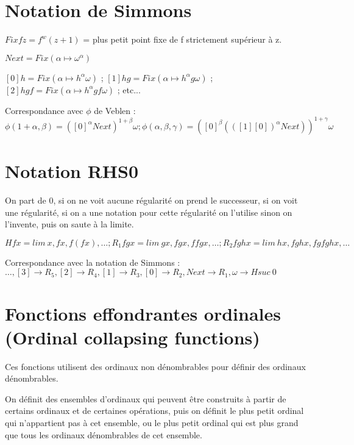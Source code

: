 \documentclass[8pt]{article}
\begin{document}
\section{Notation de Simmons}
\vspace{-0.4cm}
\( Fix f z = f^w(z+1)\) = plus petit point fixe de f strictement supérieur à z.

\( Next = Fix (\alpha \mapsto \omega^\alpha) \)

\( [0] h = Fix (\alpha \mapsto h^\alpha \omega) \) ;
\( [1] h g = Fix (\alpha \mapsto h^\alpha g \omega) \) ;
\( [2] h g f = Fix (\alpha \mapsto h^\alpha g f \omega) \) ; etc...

Correspondance avec \(\phi\) de Veblen : \( \phi(1+\alpha,\beta) = ([0]^\alpha Next)^{1+\beta} \omega ; 
 \phi(\alpha,\beta,\gamma) = ([0]^\beta (([1] [0])^\alpha Next))^{1+\gamma} \omega \)

\vspace{-0.6cm}

\section{Notation RHS0}
\vspace{-0.4cm}
On part de 0, si on ne voit aucune régularité on prend le successeur, si on voit une régularité, si on a une notation pour cette régularité on l'utilise sinon on l'invente, puis on saute à la limite.

\( H f x = lim\ x, f x, f (f x), \ldots ; R_1 f g x = lim\ g x, f g x, f f g x, \ldots ; R_2 f g h x = lim\ h x, f g h x, f g f g h x, \ldots \)

Correspondance avec la notation de Simmons : 
\( \ldots, [3] \rightarrow R_5, [2] \rightarrow R_4, [1] \rightarrow R_3, [0] \rightarrow R_2, Next \rightarrow R_1, \omega \rightarrow H suc\ 0 \)

\vspace{-0.6cm}

\section{Fonctions effondrantes ordinales (Ordinal collapsing functions)}
\vspace{-0.4cm}
Ces fonctions utilisent des ordinaux non dénombrables pour définir des ordinaux dénombrables. 

On définit des ensembles d'ordinaux qui peuvent être construits à partir de certains ordinaux et de certaines opérations, puis on définit le plus petit ordinal qui n'appartient pas à cet ensemble, ou le plus petit ordinal qui est plus grand que tous les ordinaux dénombrables de cet ensemble.
\end{document}
